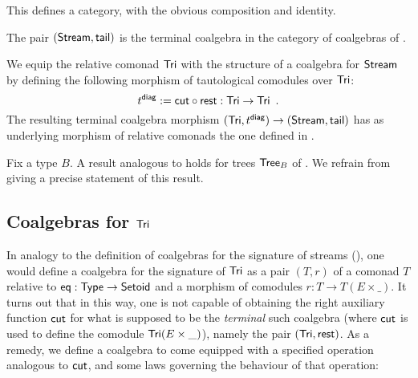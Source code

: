 \documentclass{amsart}
\begin{document}
This defines a category, with the obvious composition and identity. 

\begin{theorem}\label{thm_stream_terminal}
 The pair $(\mathsf{Stream}, \mathsf{tail})$ is the terminal coalgebra in the category of coalgebras of .
\end{theorem}

\begin{example}
  We equip the relative comonad $\mathsf{Tri}$ with the structure of a coalgebra for $\mathsf{Stream}$ by defining the following 
  morphism of tautological comodules over $\mathsf{Tri}$:
   \[ t^{\mathsf{diag}} := {\mathsf{cut}} \circ {\ensuremath{\mathsf{rest}}}  : \mathsf{Tri} \to \mathsf{Tri} \enspace . \] 
  The resulting terminal coalgebra morphism
   $(\mathsf{Tri}, t^{\mathsf{diag}}) \to (\mathsf{Stream}, \mathsf{tail})$ has as underlying morphism of relative comonads the one defined in .
\end{example}


\begin{remark}
 Fix a type $B$. A result analogous to  holds for trees $\mathsf{Tree}_B$ of . 
 We refrain from giving a precise statement of this result.
\end{remark}




\subsection{Coalgebras for $\mathsf{Tri}$}

In analogy to the definition of coalgebras for the signature of streams (), one would define
a coalgebra for the signature of $\mathsf{Tri}$ as a pair $(T,r)$ of a comonad $T$ relative to $\mathsf{eq} : \mathsf{Type} \to \mathsf{Setoid}$ and 
a morphism of comodules $r : T \to T(E\times \_)$. 
It turns out that in this way, one is not capable of obtaining the right auxiliary function $\mathsf{cut}$ for what is
supposed to be the \emph{terminal} such coalgebra (where $\mathsf{cut}$ is used to define the comodule $\mathsf{Tri}(E\times \_)$), namely the pair $(\mathsf{Tri},\mathsf{rest})$.
As a remedy, we define a coalgebra to come equipped with a specified operation analogous to $\mathsf{cut}$, and some laws governing
the behaviour of that operation:
\end{document}
